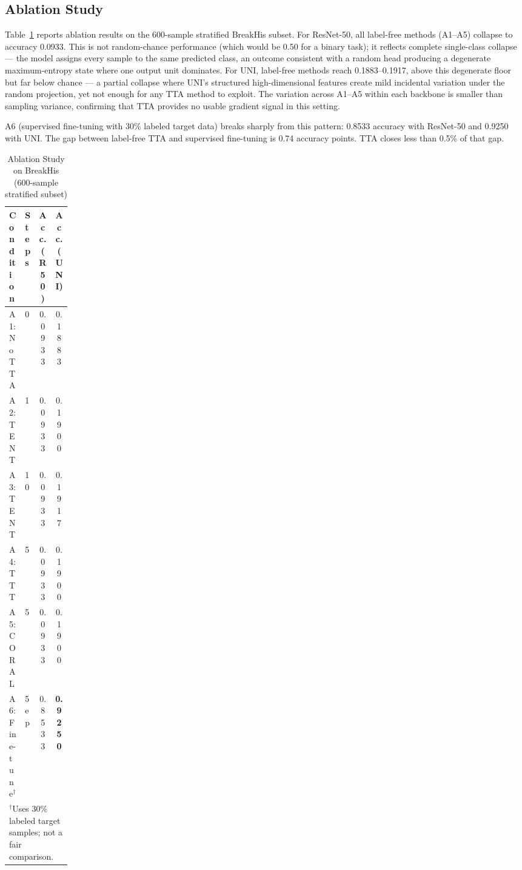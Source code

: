 \documentclass[conference]{IEEEtran}
\begin{document}
\subsection{Ablation Study}

Table~\ref{tab:ablation} reports ablation results on the 600-sample stratified BreakHis subset. For ResNet-50, all label-free methods (A1--A5) collapse to accuracy 0.0933. This is not random-chance performance (which would be 0.50 for a binary task); it reflects complete single-class collapse --- the model assigns every sample to the same predicted class, an outcome consistent with a random head producing a degenerate maximum-entropy state where one output unit dominates. For UNI, label-free methods reach 0.1883--0.1917, above this degenerate floor but far below chance --- a partial collapse where UNI's structured high-dimensional features create mild incidental variation under the random projection, yet not enough for any TTA method to exploit. The variation across A1--A5 within each backbone is smaller than sampling variance, confirming that TTA provides no usable gradient signal in this setting.

A6 (supervised fine-tuning with 30\% labeled target data) breaks sharply from this pattern: 0.8533 accuracy with ResNet-50 and 0.9250 with UNI. The gap between label-free TTA and supervised fine-tuning is 0.74 accuracy points. TTA closes less than 0.5\% of that gap.

\begin{table}[!hbt]
\caption{Ablation Study on BreakHis (600-sample stratified subset)}
\label{tab:ablation}
\centering
\begin{tabular}{lp{0.12\linewidth}cc}
\toprule
\textbf{Condition} & \textbf{Steps} & \textbf{Acc. (R50)} & \textbf{Acc. (UNI)} \\
\midrule
A1: No TTA           & 0    & 0.0933 & 0.1883 \\
A2: TENT             & 1    & 0.0933 & 0.1900 \\
A3: TENT             & 10   & 0.0933 & 0.1917 \\
A4: TTT              & 5    & 0.0933 & 0.1900 \\
A5: CORAL            & 5    & 0.0933 & 0.1900 \\
\midrule
A6: Fine-tune$^\dagger$ & 5 ep & 0.8533 & \textbf{0.9250} \\
\bottomrule
\multicolumn{4}{l}{$^\dagger$Uses 30\% labeled target samples; not a fair comparison.} \\
\end{tabular}
\end{table}
\end{document}
